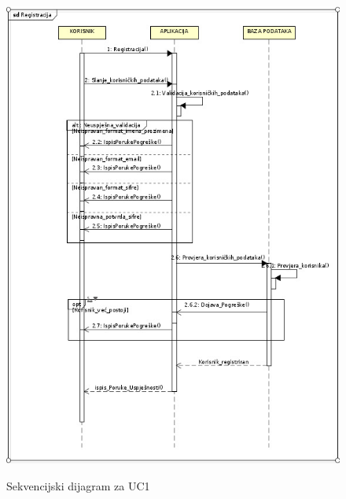 \begin{figure}[H]
	\includegraphics[scale=0.65]{slike/sekvencijski_dijagram_registracija.jpeg} %
	\centering
	\caption \newline Sekvencijski dijagram za UC1
	\label{fig:promjene}
\end{figure}

